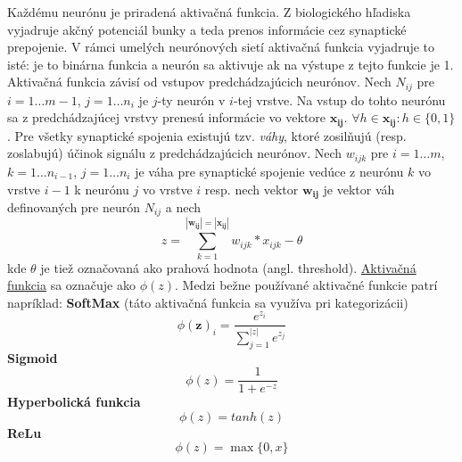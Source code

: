Každému neurónu je priradená aktivačná funkcia.
Z biologického hľadiska vyjadruje akčný potenciál bunky a teda prenos informácie cez synaptické prepojenie.
V rámci umelých neurónových sietí aktivačná funkcia vyjadruje to isté: je to binárna funkcia a neurón sa aktivuje
ak na výstupe z tejto funkcie je 1.
Aktivačná funkcia závisí od vstupov predchádzajúcich neurónov.
Nech $N_{ij}$ pre $i = 1 \dots m-1$, $j = 1 \dots n_i$ je $j$-ty neurón v $i$-tej vrstve.
Na vstup do tohto neurónu sa z predchádzajúcej vrstvy prenesú informácie vo vektore $\pmb{x_{ij}}$.
$\forall h \in \pmb{x_{ij}} \colon h \in \{0, 1\}$.
Pre všetky synaptické spojenia existujú tzv. \emph{váhy}, ktoré zosilňujú (resp. zoslabujú) účinok signálu z
predchádzajúcich neurónov.
Nech $w_{ijk}$ pre $i=1 \dots m$, $k=1 \dots n_{i-1}$, $j=1 \dots n_i$ je váha pre synaptické spojenie vedúce z
neurónu $k$ vo vrstve $i-1$ k neurónu $j$ vo vrstve $i$ resp.
nech vektor $\pmb{w_{ij}}$ je vektor váh definovaných pre neurón $N_{ij}$ a nech
\begin{equation}
    z = \sum_{k=1}^{|\pmb{w_{ij}}|=|\pmb{x_{ij}}|}{w_{ijk} * x_{ijk}}-\theta
\end{equation}
kde $\theta$ je tiež označovaná ako prahová hodnota (angl. threshold).
\hyperref[figure:activation-functions]{Aktivačná funkcia} sa označuje ako $\phi(z)$.
Medzi bežne používané aktivačné funkcie patrí napríklad:
\linebreak
\textbf{SoftMax} (táto aktivačná funkcia sa využíva pri kategorizácii)\cite{algo_ann_activation_softmax}
\begin{equation}
    \phi(\mathbf{z})_i = \frac{e^{z_i}}{\sum_{j=1}^{|z|}{e^{z_j}}}
\end{equation}
\textbf{Sigmoid}\cite{algo_ann_activation_sigmoid}
\begin{equation}
    \phi(z) = \frac{1}{1+e^{-z}}
\end{equation}
\textbf{Hyperbolická funkcia}\cite{algo_ann_activation_hyperbolic}
\begin{equation}
    \phi(z) = tanh(z)
\end{equation}
\textbf{ReLu}\cite{algo_ann_activation_relu}
\begin{equation}
    \phi(z) = \max\{0, x\}
\end{equation}

